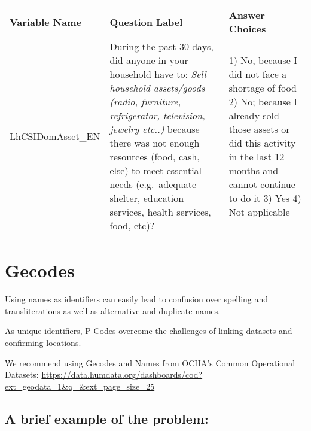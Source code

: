 \documentclass[
]{article}
\begin{document}
\begin{longtable}[]{@{}lll@{}}
\toprule
\begin{minipage}[b]{0.15\columnwidth}\raggedright
Variable Name\strut
\end{minipage} & \begin{minipage}[b]{0.49\columnwidth}\raggedright
Question Label\strut
\end{minipage} & \begin{minipage}[b]{0.27\columnwidth}\raggedright
Answer Choices\strut
\end{minipage}\tabularnewline
\midrule
\endhead
\begin{minipage}[t]{0.15\columnwidth}\raggedright
LhCSIDomAsset\_EN\strut
\end{minipage} & \begin{minipage}[t]{0.49\columnwidth}\raggedright
During the past 30 days, did anyone in your household have to: \emph{Sell household assets/goods (radio, furniture, refrigerator, television, jewelry etc..)} because there was not enough resources (food, cash, else) to meet essential needs (e.g.~adequate shelter, education services, health services, food, etc)?\strut
\end{minipage} & \begin{minipage}[t]{0.27\columnwidth}\raggedright
1) No, because I did not face a shortage of food 2) No; because I already sold those assets or did this activity in the last 12 months and cannot continue to do it 3) Yes 4) Not applicable\strut
\end{minipage}\tabularnewline
\bottomrule
\end{longtable}

\hypertarget{gecodes}{%
\section{Gecodes}\label{gecodes}}

Using names as identifiers can easily lead to confusion over spelling and transliterations as well as alternative and duplicate names.

As unique identifiers, P-Codes overcome the challenges of linking datasets and confirming locations.

We recommend using Gecodes and Names from OCHA's Common Operational Datasets:
\url{https://data.humdata.org/dashboards/cod?ext_geodata=1\&q=\&ext_page_size=25}

\hypertarget{a-brief-example-of-the-problem}{%
\subsection{A brief example of the problem:}\label{a-brief-example-of-the-problem}}
\end{document}
